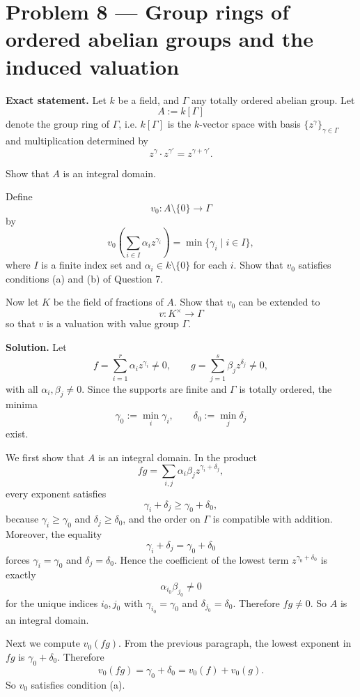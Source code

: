 \documentclass[12pt,a4paper]{article}
\theoremstyle{notespace}
\begin{document}
\section{Problem 8 --- Group rings of ordered abelian groups and the induced valuation}

\textbf{Exact statement.}
Let \(k\) be a field, and \(\Gamma\) any totally ordered abelian group. Let
\[
A:=k[\Gamma]
\]
denote the group ring of \(\Gamma\), i.e. \(k[\Gamma]\) is the \(k\)-vector space with basis \(\{z^\gamma\}_{\gamma\in\Gamma}\) and multiplication determined by
\[
z^\gamma\cdot z^{\gamma'}=z^{\gamma+\gamma'}.
\]

Show that \(A\) is an integral domain.

Define
\[
v_0:A\setminus\{0\}\to \Gamma
\]
by
\[
v_0\!\left(\sum_{i\in I}\alpha_i z^{\gamma_i}\right)=\min\{\gamma_i\mid i\in I\},
\]
where \(I\) is a finite index set and \(\alpha_i\in k\setminus\{0\}\) for each \(i\). Show that \(v_0\) satisfies conditions (a) and (b) of Question 7.

Now let \(K\) be the field of fractions of \(A\). Show that \(v_0\) can be extended to
\[
v:K^\times\to \Gamma
\]
so that \(v\) is a valuation with value group \(\Gamma\).

\textbf{Solution.}
Let
\[
f=\sum_{i=1}^r \alpha_i z^{\gamma_i}\neq 0,\qquad
g=\sum_{j=1}^s \beta_j z^{\delta_j}\neq 0,
\]
with all \(\alpha_i,\beta_j\neq 0\). Since the supports are finite and \(\Gamma\) is totally ordered, the minima
\[
\gamma_0:=\min_i\gamma_i,\qquad \delta_0:=\min_j\delta_j
\]
exist.

We first show that \(A\) is an integral domain. In the product
\[
fg=\sum_{i,j}\alpha_i\beta_j z^{\gamma_i+\delta_j},
\]
every exponent satisfies
\[
\gamma_i+\delta_j\ge \gamma_0+\delta_0,
\]
because \(\gamma_i\ge \gamma_0\) and \(\delta_j\ge \delta_0\), and the order on \(\Gamma\) is compatible with addition. Moreover, the equality
\[
\gamma_i+\delta_j=\gamma_0+\delta_0
\]
forces \(\gamma_i=\gamma_0\) and \(\delta_j=\delta_0\). Hence the coefficient of the lowest term \(z^{\gamma_0+\delta_0}\) is exactly
\[
\alpha_{i_0}\beta_{j_0}\neq 0
\]
for the unique indices \(i_0,j_0\) with \(\gamma_{i_0}=\gamma_0\) and \(\delta_{j_0}=\delta_0\). Therefore \(fg\neq 0\). So \(A\) is an integral domain.

Next we compute \(v_0(fg)\). From the previous paragraph, the lowest exponent in \(fg\) is \(\gamma_0+\delta_0\). Therefore
\[
v_0(fg)=\gamma_0+\delta_0=v_0(f)+v_0(g).
\]
So \(v_0\) satisfies condition (a).
\end{document}
